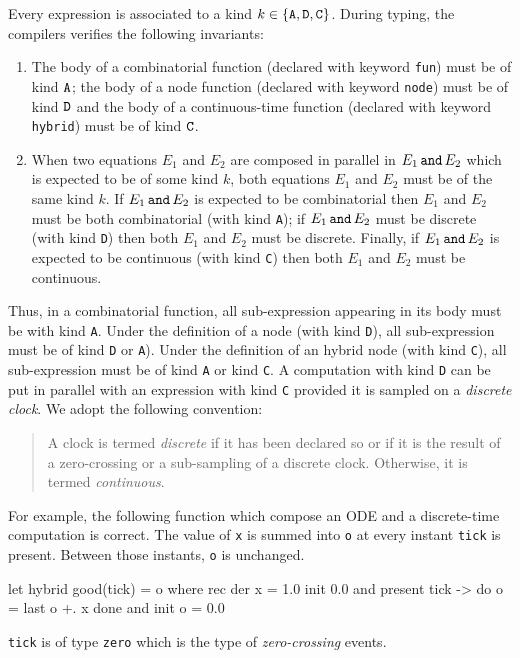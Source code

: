 \documentclass[11pt,titlepage,twoside]{report}
\newcommand{\AndEq}[2]{{#1}\,\mbox{{\tt and}}\,{#2}}
\begin{document}
Every expression is associated to a kind $k \in \{\mathtt{A}, \mathtt{D},
\mathtt{C}\}$. During typing, the compilers verifies the following invariants:
\begin{enumerate}
\item
  The body of a combinatorial function (declared with
keyword \verb-fun-) must be of kind $\mathtt{A}$; the body of a node
function (declared with keyword \verb-node-) must be of kind
$\mathtt{D}$ and the body of a continuous-time function (declared with
keyword \verb-hybrid-) must be of kind $\mathtt{C}$. 
\item
  When two equations $E_1$ and $E_2$ are composed in parallel in
  $\AndEq{E_1}{E_2}$ which is expected to be of some kind $k$, both
  equations $E_1$ and $E_2$ must be of the same kind $k$. If
  $\AndEq{E_1}{E_2}$ is expected to be combinatorial then $E_1$ and
  $E_2$ must be both combinatorial (with kind \texttt{A}); if
  $\AndEq{E_1}{E_2}$ must be discrete (with kind \texttt{D}) then both
  $E_1$ and $E_2$ must be discrete. Finally, if $\AndEq{E_1}{E_2}$ is
  expected to be continuous (with kind \texttt{C}) then both $E_1$ and
  $E_2$ must be continuous.
  \end{enumerate}
Thus, in a combinatorial function, all sub-expression appearing in
its body must be with kind \texttt{A}. Under the definition of a node
(with kind \texttt{D}), all sub-expression must be of kind \texttt{D} or
\texttt{A}). Under the definition of an hybrid node (with kind
\texttt{C}), all sub-expression must be of kind \texttt{A} or kind
\texttt{C}. A computation with kind \texttt{D} can be put in parallel
with an expression with kind \texttt{C} provided it is sampled on a
\emph{discrete clock}. We adopt the following convention:
\begin{quote}
{A clock is termed \emph{discrete} if it has been declared so or if it is the 
result of a zero-crossing or a sub-sampling of a discrete clock.
Otherwise, it is termed \emph{continuous}.}
\end{quote}
For example, the following function which compose an \ac{ODE} and a 
discrete-time
computation is correct. The value of \texttt{x} is summed into \verb-o- at every
instant \verb-tick- is present. Between those instants, \verb-o- is unchanged.
\begin{runverbatim}[withresult]
let hybrid good(tick) = o where
  rec der x = 1.0 init 0.0
  and present tick -> do o = last o +. x done
  and init o = 0.0
\end{runverbatim}
\texttt{tick} is of type \texttt{zero} which is the type of
\emph{zero-crossing} events.
\end{document}

